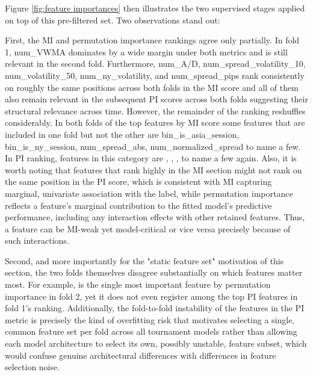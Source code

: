\documentclass[12pt, a4paper]{article}
\begin{document}
Figure \ref{fig:feature importances} then illustrates the two supervised stages applied on top of this pre-filtered set. Two observations stand out: 

\medskip

First, the MI and permutation importance rankings agree only partially. In fold 1, num\_VWMA dominates by a wide margin under both metrics and is still relevant in the second fold. 
Furthermore, num\_A/D, num\_spread\_volatility\_10, num\_volatility\_50, num\_ny\_volatility, and num\_spread\_pips rank consistently on roughly the same positions across both 
folds in the MI score and all of them also remain relevant in the subsequent PI scores across both folds suggesting their structural relevance across time.
However, the remainder of the ranking reshuffles considerably. In both folds of the top features by MI score some features that are included in one fold but not the other are
bin\_is\_asia\_session, bin\_is\_ny\_session, num\_spread\_abs, num\_normalized\_spread to name a few. In PI ranking, features in this category are 
, 
, 
, 
 to name a few again.
Also, it is worth noting that features that rank highly in the MI section might not rank on the same position in the PI score, which is consistent with MI capturing marginal, 
univariate association with the label, while permutation importance reflects a feature's marginal
contribution to the fitted model's predictive performance, including any interaction effects with other retained features. Thus, a feature can be MI-weak yet
model-critical or vice versa precisely because of such interactions. 

\medskip

Second, and more importantly for the "static feature set" motivation of this section, the two folds
themselves disagree substantially on which features matter most. For example,  is the single most important feature by permutation importance in
fold 2, yet it does not even register among the top PI features in fold 1's ranking. Additionally, the fold-to-fold instability of the features in the PI metric is precisely the 
kind of overfitting risk that motivates selecting a single, common feature set per fold across all tournament models rather than allowing each model architecture to select its own, 
possibly unstable, feature subset, which would confuse genuine architectural differences with differences in feature selection noise.
\end{document}
